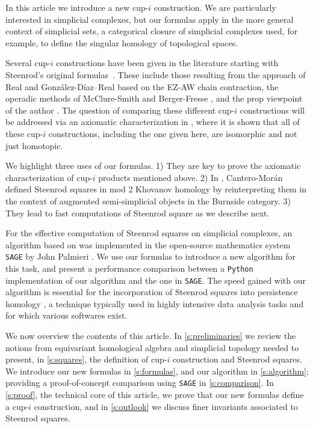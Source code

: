 In this article we introduce a new cup-$i$ construction.
We are particularly interested in simplicial complexes, but our formulas apply in the more general context of simplicial sets, a categorical closure of simplicial complexes used, for example, to define the singular homology of topological spaces.

Several cup-$i$ constructions have been given in the literature starting with Steenrod's original formulas~\cite{steenrod47}.
These include those resulting from the approach of Real \cite{real1996computability} and Gonz\'alez-D\'iaz--Real \cite{gonzalez1999combinatorial, gonzalez2003computation, gonzalez2005hpt} based on the EZ-AW chain contraction, the operadic methods of McClure-Smith \cite{mcclure03cochain} and Berger-Fresse \cite{berger04combinatorial}, and the prop viewpoint of the author \cite{medina2020prop1, medina2018prop2}.
The question of comparing these different cup-$i$ constructions will be addressed via an axiomatic characterization in \cite{medina2018axiomatic}, where it is shown that all of these cup-$i$ constructions, including the one given here, are isomorphic and not just homotopic.

We highlight three uses of our formulas.
1) They are key to prove the axiomatic characterization of cup-$i$ products mentioned above.
2) In \cite{cantero2020khovanov}, Cantero-Mor\'an defined Steenrod squares in mod 2 Khovanov homology \cite{khovanov2000categorification} by reinterpreting them in the context of augmented semi-simplicial objects in the Burnside category.
3) They lead to fast computations of Steenrod square as we describe next.

For the effective computation of Steenrod squares on simplicial complexes, an algorithm based on \cite{gonzalez1999combinatorial} was implemented in the open-source mathematics system \verb|SAGE| by John Palmieri \cite{sagemath}.
We use our formulas to introduce a new algorithm for this task, and present a performance comparison between a \verb|Python| implementation of our algorithm and the one in \verb|SAGE|.
The speed gained with our algorithm is essential for the incorporation of Steenrod squares into persistence homology \cite{medina2018persistence}, a technique typically used in highly intensive data analysis tasks \cite{carlsson2008images, carlsson2013viral, lee2018nanoporous} and for which various softwares \cite{bauer2019ripser, gudhi, medina2020giottotda} exist.

We now overview the contents of this article.
In \cref{s:preliminaries} we review the notions from equivariant homological algebra and simplicial topology needed to present, in \cref{s:squares}, the definition of cup-$i$ construction and Steenrod squares.
We introduce our new formulas in \cref{s:formulas}, and our algorithm in \cref{s:algorithm}; providing a proof-of-concept comparison using \verb|SAGE| in \cref{s:comparison}.
In \cref{s:proof}, the technical core of this article, we prove that our new formulas define a cup-$i$ construction, and in \cref{s:outlook} we discuss finer invariants associated to Steenrod squares.